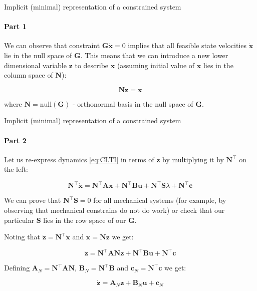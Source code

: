 \documentclass{beamer}
\begin{document}
\begin{frame}{Implicit (minimal) representation of a constrained system}
\framesubtitle{Part 1}
\begin{flushleft}

We can observe that constraint $\mathbf{G}\dot{\mathbf{x}} = 0$ implies that all feasible state velocities $\dot{\mathbf{x}}$ lie in the null space of $\mathbf{G}$. This means that we can introduce a new lower dimensional variable $\mathbf{z}$ to describe $\mathbf{x}$ (assuming initial value of $\mathbf{x}$ lies in the column space of $\mathbf{N}$):

\begin{equation}
    \mathbf{N}\mathbf{z} = \mathbf{x}
\end{equation}

where $\mathbf{N} = \text{null}(\mathbf{G})$ - orthonormal basis in the null space of $\mathbf{G}$. 
\end{flushleft}
\end{frame}


\begin{frame}{Implicit (minimal) representation of a constrained system}
\framesubtitle{Part 2}
\begin{flushleft}

Let us re-express dynamics \eqref{eq:CLTI} in terms of $\mathbf{z}$ by multiplying it by $\mathbf{N}^\top$ on the left:

\begin{equation}
    \mathbf{N}^\top \dot{\mathbf{x}} = \mathbf{N}^\top \mathbf{A} \mathbf{x} + \mathbf{N}^\top \mathbf{B} \mathbf{u} + \mathbf{N}^\top \mathbf{S} \lambda + \mathbf{N}^\top \mathbf{c}
\end{equation}

We can prove that $\mathbf{N}^\top \mathbf{S} = 0$ for all mechanical systems (for example, by observing that mechanical constrains do not do work) or check that our particular $\mathbf{S}$ lies in the row space of our $\mathbf{G}$.

Noting that $\dot{\mathbf{z}} = \mathbf{N}^\top \dot{\mathbf{x}}$ and $\mathbf{x} = \mathbf{N}\mathbf{z}$ we get:

\begin{equation}
    \dot{\mathbf{z}} = \mathbf{N}^\top \mathbf{A} \mathbf{N} \mathbf{z} + \mathbf{N}^\top \mathbf{B} \mathbf{u} + \mathbf{N}^\top \mathbf{c}
\end{equation}

Defining $\mathbf{A}_N = \mathbf{N}^\top \mathbf{A} \mathbf{N}$, $\mathbf{B}_N = \mathbf{N}^\top \mathbf{B}$ and $\mathbf{c}_N = \mathbf{N}^\top \mathbf{c}$ we get:

\begin{equation}
    \dot{\mathbf{z}} = \mathbf{A}_N \mathbf{z} + \mathbf{B}_N \mathbf{u} + \mathbf{c}_N
\end{equation}

\end{flushleft}
\end{frame}
\end{document}
